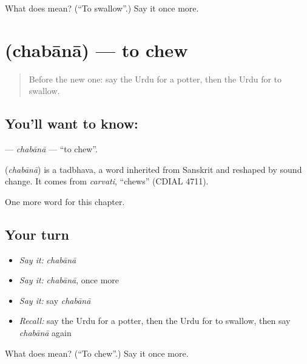 \begin{tcolorbox}[breakable,colback=teal!4,colframe=teal!35!black,title={Before you move on}]
What does  mean? (\textquotedblleft{}To swallow\textquotedblright{}.) Say it once more.
\end{tcolorbox}
\section[\texorpdfstring{\ur{چبانا} (chabānā)}{چبانا (chabānā)}]{ (chabānā) — to chew}

\label{lesson:UR-C239-chabana}



\begin{quote}
Before the new one: say the Urdu for a potter, then the Urdu for to swallow.
\end{quote}

\subsection*{You'll want to know: }
\textbf{} — \emph{chabānā} — \textquotedblleft{}to chew\textquotedblright{}.

\begin{cousinweb}
\textbf{} (\emph{chabānā}) is a tadbhava, a word inherited from Sanskrit and reshaped by sound change. It comes from \emph{carvati}, \textquotedblleft{}chews\textquotedblright{} (CDIAL 4711).
\end{cousinweb}

\begin{grammarlens}[title={What you've built}]
One more word for this chapter.
\end{grammarlens}

\subsection*{Your turn}
\begin{itemize}
\raggedright
  \item \emph{Say it:} \emph{chabānā}
  \item \emph{Say it:} \emph{chabānā}, once more
  \item \emph{Say it:} say \emph{chabānā}
  \item \emph{Recall:} say the Urdu for a potter, then the Urdu for to swallow, then say \emph{chabānā} again
\end{itemize}

\begin{tcolorbox}[breakable,colback=teal!4,colframe=teal!35!black,title={Before you move on}]
What does  mean? (\textquotedblleft{}To chew\textquotedblright{}.) Say it once more.
\end{tcolorbox}
